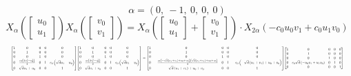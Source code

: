 \documentclass[11pt]{article}
\theoremstyle{definition}
\begin{document}
\[
\alpha = \left( 0, \  -1, \  0, \  0, \  0\right)
\]
\[
X_{\alpha}\left(\left[\begin{matrix}u_{0}\\u_{1}\end{matrix}\right]\right) X_{\alpha}\left(\left[\begin{matrix}v_{0}\\v_{1}\end{matrix}\right]\right) = X_{\alpha}\left(\left[\begin{matrix}u_{0}\\u_{1}\end{matrix}\right] + \left[\begin{matrix}v_{0}\\v_{1}\end{matrix}\right]\right) \cdot X_{2\alpha}\left(- c_{0} u_{0} v_{1} + c_{0} u_{1} v_{0}\right)
\]
\[
\resizebox{\textwidth}{!}{${\left[\begin{matrix}1 & 0 & 0 & 0 & 0\\0 & 1 & 0 & 0 & 0\\0 & 0 & 1 & 0 & 0\\0 & \frac{c_{0} \left(d u_{1}^{2} - u_{0}^{2}\right)}{2} & 0 & 1 & c_{0} \left(\sqrt{d} u_{1} - u_{0}\right)\\0 & \sqrt{d} u_{1} + u_{0} & 0 & 0 & 1\end{matrix}\right]} {\left[\begin{matrix}1 & 0 & 0 & 0 & 0\\0 & 1 & 0 & 0 & 0\\0 & 0 & 1 & 0 & 0\\0 & \frac{c_{0} \left(d v_{1}^{2} - v_{0}^{2}\right)}{2} & 0 & 1 & c_{0} \left(\sqrt{d} v_{1} - v_{0}\right)\\0 & \sqrt{d} v_{1} + v_{0} & 0 & 0 & 1\end{matrix}\right]} = {\left[\begin{matrix}1 & 0 & 0 & 0 & 0\\0 & 1 & 0 & 0 & 0\\0 & 0 & 1 & 0 & 0\\0 & - \frac{c_{0} \left(- \sqrt{d} \left(u_{1} + v_{1}\right) + u_{0} + v_{0}\right) \left(\sqrt{d} \left(u_{1} + v_{1}\right) + u_{0} + v_{0}\right)}{2} & 0 & 1 & - c_{0} \left(- \sqrt{d} \left(u_{1} + v_{1}\right) + u_{0} + v_{0}\right)\\0 & \sqrt{d} \left(u_{1} + v_{1}\right) + u_{0} + v_{0} & 0 & 0 & 1\end{matrix}\right]} {\left[\begin{matrix}1 & 0 & 0 & 0 & 0\\0 & 1 & 0 & 0 & 0\\0 & 0 & 1 & 0 & 0\\0 & c_{0} \sqrt{d} \left(- u_{0} v_{1} + u_{1} v_{0}\right) & 0 & 1 & 0\\0 & 0 & 0 & 0 & 1\end{matrix}\right]}$}
\]
\end{document}
